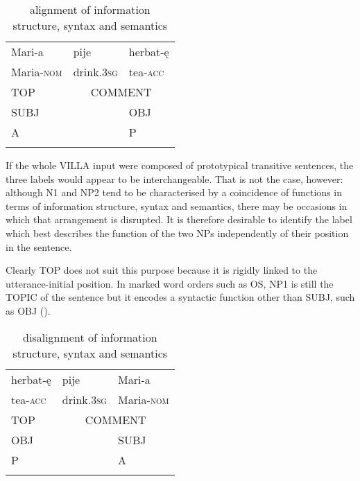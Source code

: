 \begin{table}
    \begin{tabular}{lll}
    \lsptoprule
        Mari-a & pije & herbat-ę\\
        Maria-\textsc{nom} & drink.\textsc{3sg} & tea-\textsc{acc}\\
        TOP & \multicolumn{2}{c}{COMMENT}\\
        SUBJ &  & OBJ\\
        A &  & P\\
    \lspbottomrule
    \end{tabular}
    \caption{alignment of information structure, syntax and semantics}
    \label{tab:01:1}
\end{table}

If the whole VILLA input were composed of prototypical transitive sentences, the three labels would appear to be interchangeable. That is not the case, however: although N1 and NP2 tend to be characterised by a coincidence of functions in terms of information structure, syntax and semantics, there may be occasions in which that arrangement is disrupted. It is therefore desirable to identify the label which best describes the function of the two NPs independently of their position in the sentence.

Clearly TOP does not suit this purpose because it is rigidly linked to the utterance-initial position. In marked word orders such as OS, NP1 is still the TOPIC of the sentence but it encodes a syntactic function other than SUBJ, such as OBJ ().

\begin{table}
    \begin{tabular}{lll}
    \lsptoprule
        herbat-ę & pije & Mari-a \\
        tea-\textsc{acc} & drink.\textsc{3sg} & Maria-\textsc{nom}\\
        TOP & \multicolumn{2}{c}{COMMENT}\\
        OBJ &  & SUBJ\\
        P &  & A\\
    \lspbottomrule
    \end{tabular}
    \caption{disalignment of information structure, syntax and semantics}
    \label{tab:01:2}
\end{table}


